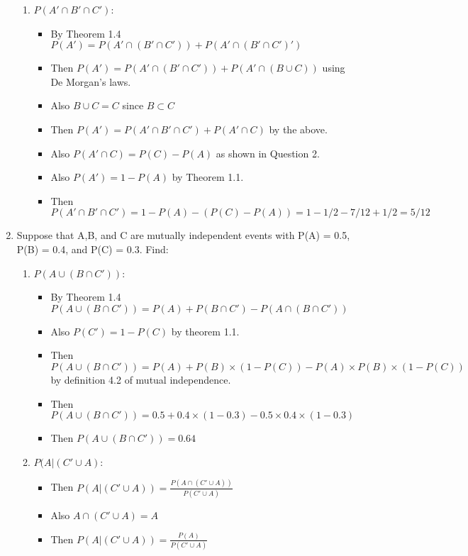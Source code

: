 \documentclass{article}
\begin{document}
\begin{enumerate}
\begin{enumerate}
    \item $P(A' \cap B' \cap C')$:
        \begin{itemize}
        \item By Theorem 1.4 $P(A') = P(A' \cap (B' \cap C')) + P(A' \cap (B' \cap C')')$
        \item Then $P(A') = P(A' \cap (B' \cap C')) + P(A' \cap (B \cup C))$ using De Morgan's laws.
        \item Also $B \cup C = C$ since $B \subset C$
        \item Then $P(A') = P(A' \cap B' \cap C') + P(A' \cap C)$ by the above.
        \item Also $P(A' \cap C) = P(C) - P(A)$ as shown in Question 2.
        \item Also $P(A') = 1 - P(A)$ by Theorem 1.1.
        \item Then $P(A' \cap B' \cap C') = 1 - P(A) - (P(C) - P(A)) = 1 - 1/2 - 7/12 + 1/2 = 5/12$
        \end{itemize}
    \end{enumerate}
\item Suppose that A,B, and C are mutually independent events with P(A) = 0.5, P(B) =
0.4, and P(C) = 0.3. Find:
    \begin{enumerate}
    \item $P(A \cup (B \cap C'))$:
        \begin{itemize}
        \item By Theorem 1.4 $P(A \cup (B \cap C')) = P(A) + P(B \cap C') - P(A \cap (B \cap C'))$
        \item Also $P(C') = 1 - P(C)$ by theorem 1.1.
        \item Then $P(A \cup (B \cap C')) = P(A) + P(B) \times (1 - P(C)) - P(A) \times P(B) \times (1 - P(C))$ by definition 4.2 of mutual independence.
        \item Then $P(A \cup (B \cap C')) = 0.5 + 0.4 \times (1 - 0.3) - 0.5 \times 0.4 \times (1 - 0.3)$
        \item Then $P(A \cup (B \cap C')) = 0.64$
        \end{itemize}
    \item $P(A | (C' \cup A)$:
        \begin{itemize}
        \item Then $P(A | (C' \cup A)) = \frac{P(A \cap (C' \cup A))}{P(C' \cup A)}$
        \item Also $A \cap (C' \cup A) = A$
        \item Then $P(A | (C' \cup A)) = \frac{P(A)}{P(C' \cup A)}$

\end{itemize}
\end{enumerate}
\end{enumerate}
\end{document}
